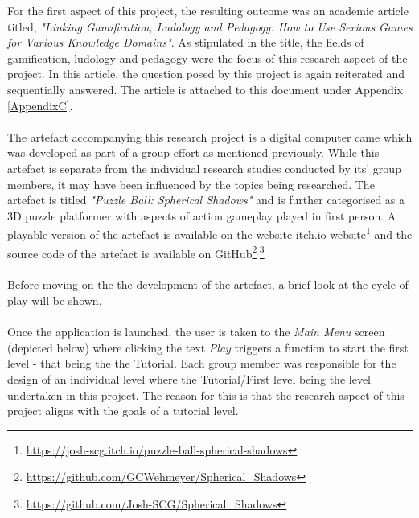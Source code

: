 \noindent For the first aspect of this project, the resulting outcome was an academic article titled, \textit{"Linking Gamification, Ludology and Pedagogy: How to Use Serious Games for Various Knowledge Domains"}. As stipulated in the title, the fields of gamification, ludology and pedagogy were the focus of this research aspect of the project. In this article, the question posed by this project is again reiterated and sequentially answered. The article is attached to this document under Appendix  \ref{AppendixC}. 
\\\\
The artefact accompanying this research project is a digital computer came which was developed as part of a group effort as mentioned previously. While this artefact is separate from the individual research studies conducted by its' group members, it may have been influenced by the topics being researched. The artefact is titled \textit{"Puzzle Ball: Spherical Shadows"} and is further categorised as a 3D puzzle platformer with aspects of action gameplay played in first person. A playable version of the artefact is available on the website itch.io website\footnote{\url{https://josh-scg.itch.io/puzzle-ball-spherical-shadows}} and the source code of the artefact is available on GitHub\footnote{\url{https://github.com/GCWehmeyer/Spherical_Shadows}}$^{,}$\footnote{\url{https://github.com/Josh-SCG/Spherical_Shadows}}
\\\\
Before moving on the the development of the artefact, a brief look at the cycle of play will be shown. 
\\\\
Once the application is launched, the user is taken to the \textit{Main Menu} screen (depicted below) where clicking the text \textit{Play} triggers a function to start the first level - that being the the Tutorial. Each group member was responsible for the design of an individual level where the Tutorial/First level being the level undertaken in this project. The reason for this is that the research aspect of this project aligns with the goals of a tutorial level.


